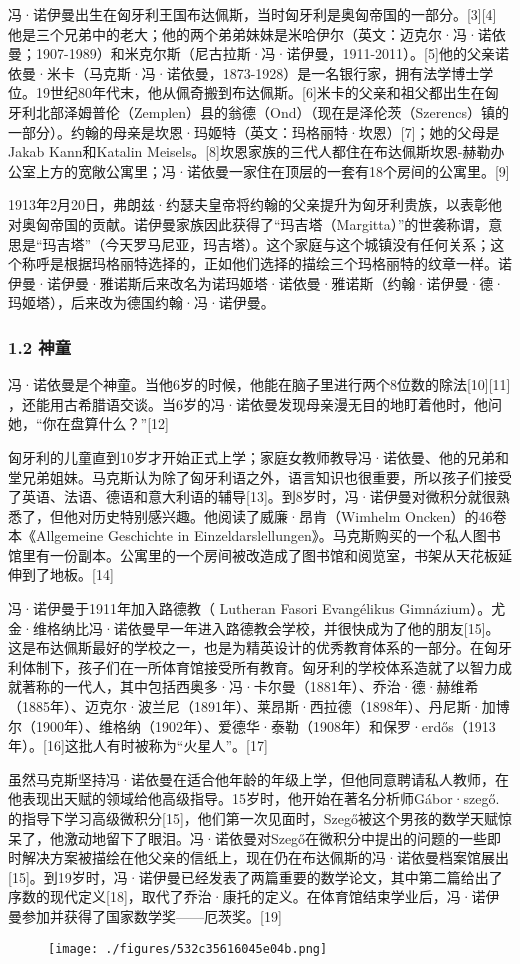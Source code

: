 冯·诺伊曼出生在匈牙利王国布达佩斯，当时匈牙利是奥匈帝国的一部分。[3][4] 他是三个兄弟中的老大；他的两个弟弟妹妹是米哈伊尔（英文：迈克尔·冯·诺依曼；1907-1989）和米克尔斯（尼古拉斯·冯·诺伊曼，1911-2011）。[5]他的父亲诺依曼·米卡（马克斯·冯·诺依曼，1873-1928）是一名银行家，拥有法学博士学位。19世纪80年代末，他从佩奇搬到布达佩斯。[6]米卡的父亲和祖父都出生在匈牙利北部泽姆普伦（Zemplen）县的翁德（Ond）（现在是泽伦茨（Szerencs）镇的一部分）。约翰的母亲是坎恩·玛姬特（英文：玛格丽特·坎恩）[7]；她的父母是Jakab Kann和Katalin Meisels。[8]坎恩家族的三代人都住在布达佩斯坎恩-赫勒办公室上方的宽敞公寓里；冯·诺依曼一家住在顶层的一套有18个房间的公寓里。[9]

1913年2月20日，弗朗兹·约瑟夫皇帝将约翰的父亲提升为匈牙利贵族，以表彰他对奥匈帝国的贡献。诺伊曼家族因此获得了“玛吉塔（Margitta）”的世袭称谓，意思是“玛吉塔”（今天罗马尼亚，玛吉塔）。这个家庭与这个城镇没有任何关系；这个称呼是根据玛格丽特选择的，正如他们选择的描绘三个玛格丽特的纹章一样。诺伊曼·诺伊曼·雅诺斯后来改名为诺玛姬塔·诺依曼·雅诺斯（约翰·诺伊曼·德·玛姬塔），后来改为德国约翰·冯·诺伊曼。
\subsubsection{1.2 神童}
冯·诺依曼是个神童。当他6岁的时候，他能在脑子里进行两个8位数的除法[10][11] ，还能用古希腊语交谈。当6岁的冯·诺依曼发现母亲漫无目的地盯着他时，他问她，“你在盘算什么？”[12]

匈牙利的儿童直到10岁才开始正式上学；家庭女教师教导冯·诺依曼、他的兄弟和堂兄弟姐妹。马克斯认为除了匈牙利语之外，语言知识也很重要，所以孩子们接受了英语、法语、德语和意大利语的辅导[13]。到8岁时，冯·诺伊曼对微积分就很熟悉了，但他对历史特别感兴趣。他阅读了威廉·昂肯（Wimhelm Oncken）的46卷本《Allgemeine Geschichte in Einzeldarslellungen》。马克斯购买的一个私人图书馆里有一份副本。公寓里的一个房间被改造成了图书馆和阅览室，书架从天花板延伸到了地板。[14]

冯·诺伊曼于1911年加入路德教（ Lutheran Fasori Evangélikus Gimnázium）。尤金·维格纳比冯·诺依曼早一年进入路德教会学校，并很快成为了他的朋友[15]。这是布达佩斯最好的学校之一，也是为精英设计的优秀教育体系的一部分。在匈牙利体制下，孩子们在一所体育馆接受所有教育。匈牙利的学校体系造就了以智力成就著称的一代人，其中包括西奥多·冯·卡尔曼（1881年）、乔治·德·赫维希（1885年）、迈克尔·波兰尼（1891年）、莱昂斯·西拉德（1898年）、丹尼斯·加博尔（1900年）、维格纳（1902年）、爱德华·泰勒（1908年）和保罗·erdős（1913年）。[16]这批人有时被称为“火星人”。[17]

虽然马克斯坚持冯·诺依曼在适合他年龄的年级上学，但他同意聘请私人教师，在他表现出天赋的领域给他高级指导。15岁时，他开始在著名分析师Gábor·szegő.的指导下学习高级微积分[15]，他们第一次见面时，Szegő被这个男孩的数学天赋惊呆了，他激动地留下了眼泪。冯·诺依曼对Szegő在微积分中提出的问题的一些即时解决方案被描绘在他父亲的信纸上，现在仍在布达佩斯的冯·诺依曼档案馆展出[15]。到19岁时，冯·诺伊曼已经发表了两篇重要的数学论文，其中第二篇给出了序数的现代定义[18]，取代了乔治·康托的定义。在体育馆结束学业后，冯·诺伊曼参加并获得了国家数学奖——厄茨奖。[19]
\begin{figure}[ht]
\centering
\texttt{[image: ./figures/532c35616045e04b.png]}
\caption{} \label{fig_von_2}
\end{figure}
